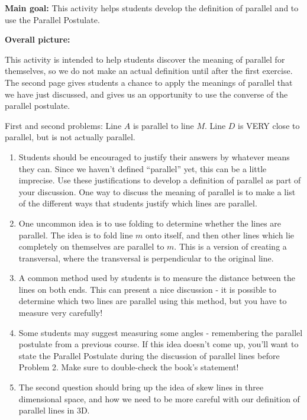 \documentclass[nooutcomes,noauthor]{ximera}
\begin{document}
\begin{instructorNotes}

{\bf Main goal:} This activity helps students develop the definition of parallel and to use the Parallel Postulate.

{\bf Overall picture:}

This activity is intended to help students discover the meaning of parallel for themselves, so we do not make an actual definition until after the first exercise.  The second page gives students a chance to apply the meanings of parallel that we have just discussed, and gives us an opportunity to use the converse of the parallel postulate.

First and second problems: Line $A$ is parallel to line $M$.  Line $D$ is VERY close to parallel, but is not actually parallel.
\begin{enumerate}
\item Students should be encouraged to justify their answers by whatever means they can.  Since we haven't defined ``parallel'' yet, this can be a little imprecise. Use these justifications to develop a definition of parallel as part of your discussion.  One way to discuss the meaning of parallel is to make a list of the different ways that students justify which lines are parallel.
\item One uncommon idea is to use folding to determine whether the lines are parallel. The idea is to fold line $m$ onto itself, and then other lines which lie completely on themselves are parallel to $m$. This is a version of creating a transversal, where the transversal is perpendicular to the original line.
\item A common method used by students is to measure the distance between the lines on both ends.  This can present a nice discussion - it is possible to determine which two lines are parallel using this method, but you have to measure very carefully!
\item Some students may suggest measuring some angles - remembering the parallel postulate from a previous course.  If this idea doesn't come up, you'll want to state the Parallel Postulate during the discussion of parallel lines before Problem 2.  Make sure to double-check the book's statement! 
\item The second question should bring up the idea of skew lines in three dimensional space, and how we need to be more careful with our definition of parallel lines in 3D.
\end{enumerate}


\end{instructorNotes}
\end{document}
